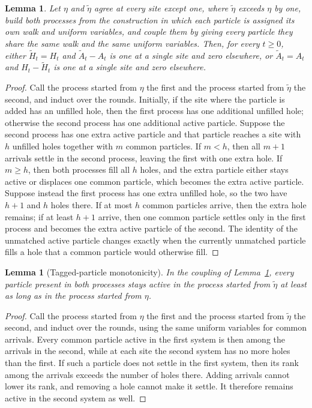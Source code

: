 \documentclass[11pt]{amsart}
\theoremstyle{plain}
\newtheorem{lemma}[theorem]{Lemma}
\theoremstyle{definition}
\begin{document}
\begin{lemma}\label{lem:one-particle}
	Let $\eta$ and $\widetilde\eta$ agree at every site except one, where
	$\widetilde\eta$ exceeds $\eta$ by one, build both processes from the
	construction in which each particle is assigned its own walk and uniform
	variables, and couple them by
	giving every particle they share the same walk and the same uniform
	variables. Then, for every $t\geq0$, either $\widetilde H_t=H_t$ and
	$\widetilde A_t-A_t$ is one at a single site and zero elsewhere, or
	$\widetilde A_t=A_t$ and $H_t-\widetilde H_t$ is one at a single site and
	zero elsewhere.
\end{lemma}

\begin{proof}
	Call the process started from $\eta$ the first and the process started from
	$\widetilde\eta$ the second, and induct over the rounds. Initially, if the
	site where the particle is added has an unfilled hole, then the first process
	has one additional unfilled hole; otherwise the second process has one
	additional active particle. Suppose the second
	process has one extra active particle and that particle reaches a site with
	$h$ unfilled holes together with $m$ common particles. If $m<h$, then all
	$m+1$ arrivals settle in the second process, leaving the first with one extra
	hole. If $m\geq h$, then both processes fill all $h$ holes, and the extra
	particle either stays active or displaces one common particle, which becomes
	the extra active particle. Suppose instead the first process has one extra
	unfilled hole, so the two have $h+1$ and $h$ holes there. If at most $h$
	common particles arrive, then the extra hole remains; if at least $h+1$
	arrive, then one common particle settles only in the first process and
	becomes the extra active particle of the second. The identity of the unmatched
	active particle changes exactly when the currently unmatched particle fills a
	hole that a common particle would otherwise fill.
\end{proof}

\begin{lemma}[Tagged-particle monotonicity]\label{lem:tagged-monotonicity}
	In the coupling of Lemma~\ref{lem:one-particle}, every particle present in
	both processes
	stays active in the process started from $\widetilde\eta$ at least as long as
	in the process started from $\eta$.
\end{lemma}

\begin{proof}
	Call the process started from $\eta$ the first and the process started from
	$\widetilde\eta$ the second, and induct over the rounds, using the same
	uniform variables for common arrivals. Every
	common particle active in the first system is then among the arrivals in the
	second, while at each site the second system has no more holes than the first.
	If such a
	particle does not settle in the first system, then its rank among the arrivals
	exceeds the number of holes there. Adding arrivals cannot lower its rank, and removing a
	hole cannot make it settle. It therefore remains active in the second system
	as well.
\end{proof}
\end{document}
